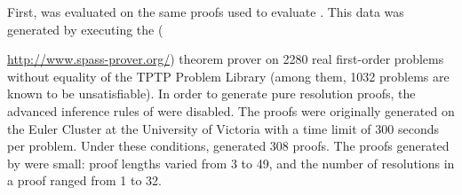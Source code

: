 First, {\FORPI} was evaluated on the same proofs used to evaluate {\GFOLU}. This data was generated by executing the {\SPASS} ({\url{http://www.spass-prover.org/}) theorem prover on 2280 real first-order problems without equality of the TPTP Problem Library (among them, 1032 problems are known to be unsatisfiable). In order to generate pure resolution proofs, the advanced inference rules of {\SPASS} were disabled. The proofs were originally generated on the Euler Cluster at the University of Victoria with a time limit of 300 seconds per problem. Under these conditions, {\SPASS} generated 308 proofs. The proofs generated by {\SPASS} were small: proof lengths varied from 3 to 49, and the number of resolutions in a proof ranged from 1 to 32.



}
